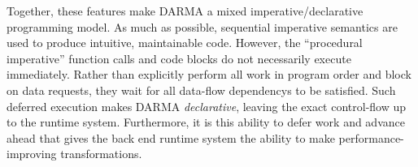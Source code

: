 Together, these features make \gls{DARMA} a mixed \gls{imperative}/\gls{declarative} \gls{programming model}.
As much as possible, sequential \gls{imperative} semantics are used to produce intuitive, maintainable code.
However, the ``\gls{procedural} \gls{imperative}'' function calls and code
blocks do not necessarily execute immediately.
Rather than explicitly perform all work in program order and block on data requests,
they wait for all \glspl{data-flow dependency} to be satisfied.
Such \gls{deferred execution} makes \gls{DARMA} \emph{declarative}, leaving the
exact control-flow up to the \gls{runtime system}.
Furthermore, it is this ability to defer work and advance ahead that gives the \gls{back end}
\gls{runtime  system} the ability to make performance-improving transformations.








